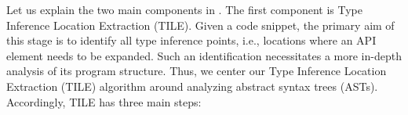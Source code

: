 


Let us explain the two main components in {\tool}. The first component is Type Inference Location Extraction (TILE).
%
Given a code snippet, the primary aim of this stage is to identify all type inference points, i.e., locations where an API element needs to be expanded. Such an identification necessitates a more in-depth analysis of its program structure. Thus, we center our Type Inference Location Extraction (TILE) algorithm around analyzing abstract syntax trees (ASTs). Accordingly, TILE has three main steps:

